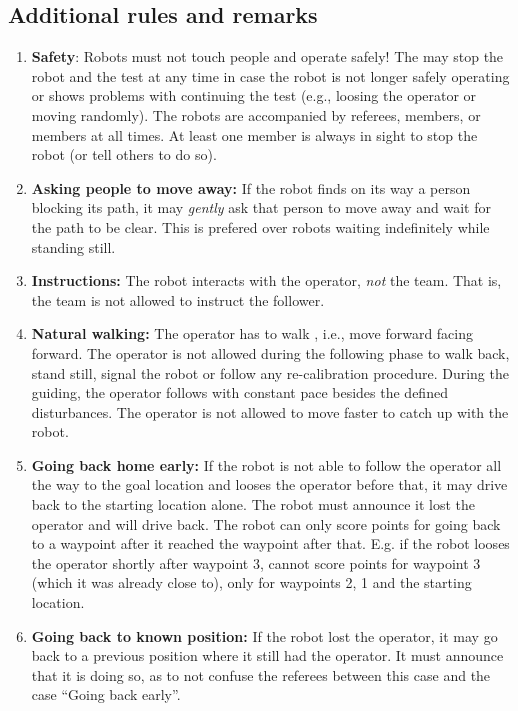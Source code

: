 \subsection{Additional rules and remarks}
\begin{enumerate}
\item \textbf{Safety}: Robots must not touch people and operate safely! 
  The \TC may stop the robot and the test at any time in case the robot is not longer safely operating or shows problems with continuing the test (e.g., loosing the operator or moving randomly).
  The robots are accompanied by referees, \OC members, or \TC members at all times.
  At least one \TC member is always in sight to stop the robot (or tell others to do so).
\item \textbf{Asking people to move away:} If the robot finds on its way a person blocking its path, it may \textit{gently} ask that person to move away and wait for the path to be clear. 
  This is prefered over robots waiting indefinitely while standing still. 
\item \textbf{Instructions:} The robot interacts with the operator, \emph{not} the team. 
  That is, the team is not allowed to instruct the follower.
\item \textbf{Natural walking:} The operator has to walk , i.e., move forward facing forward. 
  The operator is not allowed during the following phase to walk back, stand still, signal the robot or follow any re-calibration procedure.
  During the guiding, the operator follows with constant pace besides the defined disturbances. 
  The operator is not allowed to move faster to catch up with the robot. 
\item \textbf{Going back home early: } If the robot is not able to follow the operator all the way to the goal location and looses the operator before that, it may drive back to the starting location alone.
  The robot must announce it lost the operator and will drive back. 
  The robot can only score points for going back to a waypoint after it reached the waypoint after that. 
  E.g. if the robot looses the operator shortly after waypoint 3, cannot score points for waypoint 3 (which it was already close to), only for waypoints 2, 1 and the starting location.
\item \textbf{Going back to known position: } If the robot lost the operator, it may go back to a previous position where it still had the operator. 
  It must announce that it is doing so, as to not confuse the referees between this case and the case ``Going back early''. 
\end{enumerate}

